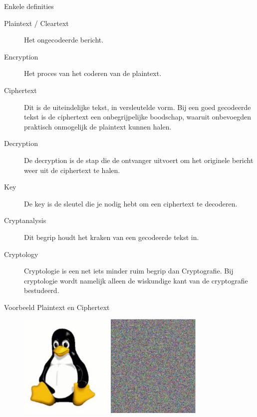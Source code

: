 \documentclass{beamer}
\begin{document}
\begin{frame}{Enkele definities}
	\begin{description}
		\item[Plaintext / Cleartext] Het ongecodeerde bericht. 
			
		\item[Encryption] Het proces van het coderen van de plaintext.
		\item[Ciphertext] 
		
		Dit is de uiteindelijke tekst, in versleutelde vorm. Bij een goed gecodeerde tekst is de ciphertext een onbegrijpelijke boodschap, waaruit onbevoegden praktisch onmogelijk de plaintext kunnen halen.
		\item[Decryption] 
		
		De decryption is de stap die de ontvanger uitvoert om het originele bericht weer uit de ciphertext te halen. 
		\item[Key] 
		
		De key is de sleutel die je nodig hebt om een ciphertext te decoderen. 
		\item[Cryptanalysis] 
		Dit begrip houdt het kraken van een gecodeerde tekst in. 
		\item[Cryptology] 
		Cryptologie is een net iets minder ruim begrip dan Cryptografie. Bij cryptologie wordt namelijk alleen de wiskundige kant van de cryptografie bestudeerd.
	\end{description}
\end{frame}

\begin{frame}{Voorbeeld Plaintext en Ciphertext}
\begin{center}
\begin{figure}
	\includegraphics[width=0.40\textwidth]{img/Tux.png}
	\quad
	\includegraphics[width=0.40\textwidth]{img/Tux_secure.png}
\end{figure}
\end{center}
\end{frame}
\end{document}
